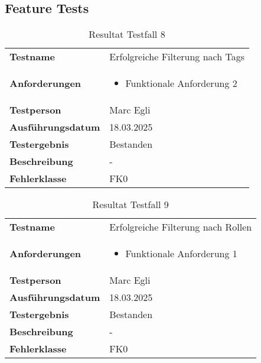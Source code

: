 \subsection{Feature Tests}

\begin{table}[H]
    \begin{tabular}{|L{0.3\textwidth}|L{0.65\textwidth}|}
        \hline
           \\[10pt]
        \hline
        \textbf{Testname} & Erfolgreiche Filterung nach Tags \\
        \hline
        \textbf{Anforderungen} & 
        \begin{itemize}
            \item Funktionale Anforderung 2
        \end{itemize} \\
        \hline
        \textbf{Testperson} & Marc Egli \\
        \hline
        \textbf{Ausführungsdatum} & 18.03.2025 \\
        \hline
        \textbf{Testergebnis} & Bestanden \\
        \hline
        \textbf{Beschreibung} & - \\ 
        \hline
        \textbf{Fehlerklasse} & FK0 \\ 
        \hline
    \end{tabular}
    \caption{Resultat Testfall 8}
\end{table}

\begin{table}[H]
    \begin{tabular}{|L{0.3\textwidth}|L{0.65\textwidth}|}
        \hline
           \\[10pt]
        \hline
        \textbf{Testname} & Erfolgreiche Filterung nach Rollen \\
        \hline
        \textbf{Anforderungen} & 
        \begin{itemize}
            \item Funktionale Anforderung 1
        \end{itemize} \\
        \hline
        \textbf{Testperson} & Marc Egli \\
        \hline
        \textbf{Ausführungsdatum} & 18.03.2025 \\
        \hline
        \textbf{Testergebnis} & Bestanden \\
        \hline
        \textbf{Beschreibung} & - \\ 
        \hline
        \textbf{Fehlerklasse} & FK0 \\ 
        \hline
    \end{tabular}
    \caption{Resultat Testfall 9}
\end{table}

